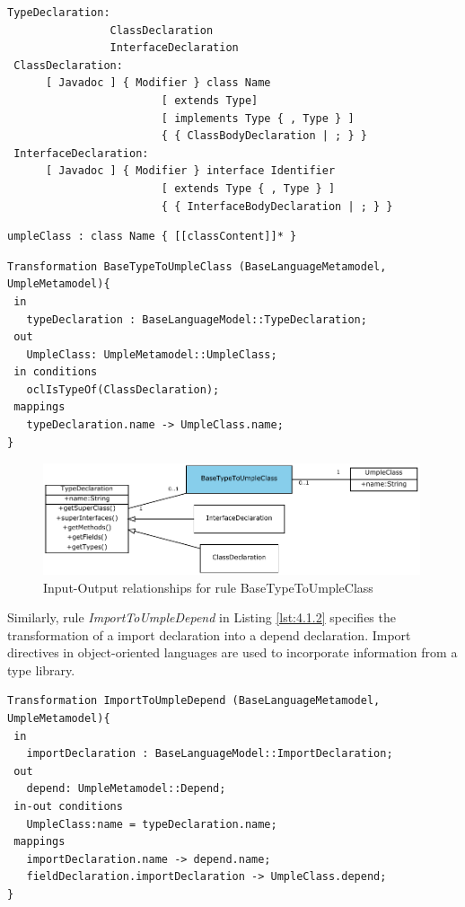 \begin{lstlisting}[style=mine,caption=Grammar for Java Types,label=lst:javaGrammar1]
TypeDeclaration:
                ClassDeclaration
                InterfaceDeclaration
 ClassDeclaration:
      [ Javadoc ] { Modifier } class Name
                        [ extends Type]
                        [ implements Type { , Type } ]
                        { { ClassBodyDeclaration | ; } }
 InterfaceDeclaration:
      [ Javadoc ] { Modifier } interface Identifier
                        [ extends Type { , Type } ]
                        { { InterfaceBodyDeclaration | ; } }
\end{lstlisting}

\begin{lstlisting}[style=mine,caption=Grammar for Umple Classes,label=lst:umpleGrammar2]
 umpleClass : class Name { [[classContent]]* }
\end{lstlisting}

\begin{lstlisting}[style=mine,caption=Rule BaseTypeToUmpleClass,label=lst:4.1.1]
Transformation BaseTypeToUmpleClass (BaseLanguageMetamodel, UmpleMetamodel){ 
 in
   typeDeclaration : BaseLanguageModel::TypeDeclaration;
 out
   UmpleClass: UmpleMetamodel::UmpleClass;
 in conditions
   oclIsTypeOf(ClassDeclaration);   
 mappings
   typeDeclaration.name -> UmpleClass.name;
}
\end{lstlisting}

\begin{figure}[h]
\centering
\includegraphics[width=0.99\textwidth]{Figures/ch4InitialMapping.pdf}
\caption{Input-Output relationships for rule BaseTypeToUmpleClass}
\label{fig:4.1.1}
\end{figure}

Similarly, rule  \textit{ImportToUmpleDepend} in Listing \ref{lst:4.1.2} specifies the transformation of a import declaration into a depend declaration. Import directives in object-oriented languages are used to incorporate information from a type library. 

\begin{lstlisting}[style=mine,caption=Rule JavaImportToUmpleDepend,label=lst:4.1.2]
Transformation ImportToUmpleDepend (BaseLanguageMetamodel, UmpleMetamodel){ 
 in
   importDeclaration : BaseLanguageModel::ImportDeclaration;
 out
   depend: UmpleMetamodel::Depend;
 in-out conditions
   UmpleClass:name = typeDeclaration.name;
 mappings
   importDeclaration.name -> depend.name;
   fieldDeclaration.importDeclaration -> UmpleClass.depend;
}
\end{lstlisting}

